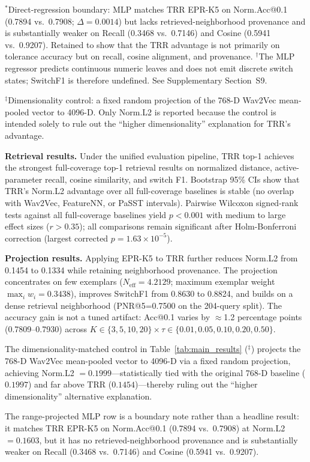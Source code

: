 $^*$Direct-regression boundary: MLP matches TRR EPR-K5 on Norm.Acc@0.1 (0.7894 vs.\ 0.7908; $\Delta=0.0014$) but lacks retrieved-neighborhood provenance and is substantially weaker on Recall (0.3468 vs.\ 0.7146) and Cosine (0.5941 vs.\ 0.9207). Retained to show that the TRR advantage is not primarily on tolerance accuracy but on recall, cosine alignment, and provenance.
$^{\dagger}$The MLP regressor predicts continuous numeric leaves and does not emit discrete switch states; SwitchF1 is therefore undefined. See Supplementary Section~S9.

$^\ddagger$Dimensionality control: a fixed random projection of the 768-D Wav2Vec mean-pooled vector to 4096-D. Only Norm.L2 is reported because the control is intended solely to rule out the ``higher dimensionality'' explanation for TRR's advantage.

\textbf{Retrieval results.} Under the unified evaluation pipeline, TRR top-1 achieves the strongest full-coverage top-1 retrieval results on normalized distance, active-parameter recall, cosine similarity, and switch F1. Bootstrap 95\% CIs show that TRR's Norm.L2 advantage over all full-coverage baselines is stable (no overlap with Wav2Vec, FeatureNN, or PaSST intervals). Pairwise Wilcoxon signed-rank tests against all full-coverage baselines yield $p < 0.001$ with medium to large effect sizes ($r > 0.35$); all comparisons remain significant after Holm-Bonferroni correction (largest corrected $p = 1.63 \times 10^{-5}$).

\textbf{Projection results.} Applying EPR-K5 to TRR further reduces Norm.L2 from 0.1454 to 0.1334 while retaining neighborhood provenance. The projection concentrates on few exemplars ($N_{\mathrm{eff}}=4.2129$; maximum exemplar weight $\max_i w_i=0.3438$), improves SwitchF1 from 0.8630 to 0.8824, and builds on a dense retrieval neighborhood (PNR@5=0.7500 on the 204-query split). The accuracy gain is not a tuned artifact: Acc@0.1 varies by $\approx$1.2 percentage points (0.7809--0.7930) across $K \in \{3, 5, 10, 20\} \times \tau \in \{0.01, 0.05, 0.10, 0.20, 0.50\}$.

The dimensionality-matched control in Table~\ref{tab:main_results} ($^\ddagger$) projects the 768-D Wav2Vec mean-pooled vector to 4096-D via a fixed random projection, achieving Norm.L2 $=0.1999$---statistically tied with the original 768-D baseline ($0.1997$) and far above TRR ($0.1454$)---thereby ruling out the ``higher dimensionality'' alternative explanation.

The range-projected MLP row is a boundary note rather than a headline result: it matches TRR EPR-K5 on Norm.Acc@0.1 (0.7894 vs.\ 0.7908) at Norm.L2 $=0.1603$, but it has no retrieved-neighborhood provenance and is substantially weaker on Recall (0.3468 vs.\ 0.7146) and Cosine (0.5941 vs.\ 0.9207).

